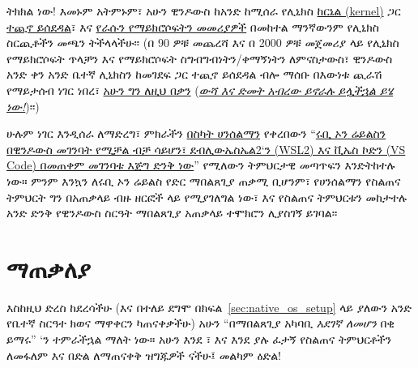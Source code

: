 ትክክል ነው! እመኑም አትምኑም፣ አሁን ዊንዶውስ ከአንድ ከሚሰራ የሊኒክስ \href{https://en.wikipedia.org/wiki/Kernel_(operating_system)}{ከርኔል (kernel)} ጋር \href{https://devblogs.microsoft.com/commandline/announcing-wsl-2/}{ተጪኖ ይሰደዳል}፣ እና \href{https://docs.microsoft.com/en-us/windows/wsl/install-win10}{የራሱን የማይክሮሶፍትን መመሪያዎች} በመከተል ማንኛውንም የሊኒክስ ስርጪቶችን መጫን ትችላላችሁ፡፡ (በ 90 ዎቹ መጨረሻ እና በ 2000 ዎቹ መጀመሪያ ላይ የሊኒክስ የማይክሮሶፍት ጥላቻን እና የማይክሮሶፍት ስግብግብነትን/ቀማኝነትን ለምናስታውስ፣ ዊንዶውስ አንድ ቀን አንድ ቤተኛ ሊኒክስን ከመገደፍ ጋር ተጪኖ ይሰደዳል ብሎ ማሰቡ በእውነቱ ጪራሽ የማይታሰብ ነገር ነበረ፣ \href{https://docs.microsoft.com/en-us/windows/wsl/install-win10}{አሁን ግን ለዚህ በቃን} (\href{https://youtu.be/JmzuRXLzqKk}{\emph{ውሻ እና ድመት አብረው ይኖራሉ ይሏችኋል ይሄ ነው!}})፡፡)

ሁሉም ነገር እንዲሰራ ለማድረግ፣ ምክራችን \href{https://www.hanselman.com/}{በስካት ሀንሰልማን} የቀረበውን ``\href{https://www.hanselman.com/blog/RubyOnRailsOnWindowsIsNotJustPossibleItsFabulousUsingWSL-8AndVSCode.aspx}{ሩቢ ኦን ሬይልስን በዊንዶውስ መገንባት የሚቻል ብቻ ሳይሆን፣ ደብሊውኤስኤል2`ን (WSL2) እና ቪኤስ ኮድን (VS Code) በመጠቀም መገንባቱ እጅግ ድንቅ ነው}'' የሚለውን ትምህርታዊ መጣጥፍን እንድትከተሉ ነው። ምንም እንኳን ለሩቢ ኦን ሬይልስ የድር ማበልጸጊያ ጠቃሚ ቢሆንም፣ የሀንሰልማን የስልጠና ትምህርት ግን በአጠቃላይ ብዙ ዘርፎች ላይ የሚያገለግል ነው፣ እና የስልጠና ትምህርቱን መከታተሉ አንድ ድንቅ የዊንዶውስ ስርዓት ማበልጸጊያ አጠቃላይ ተሞክሮን ሊያስገኝ ይገባል፡፡



\section{ማጠቃለያ} %
\label{sec:conclusion}

እስከዚህ ድረስ ከደረሳችሁ (እና በተለይ ደግሞ በክፍል~\ref{sec:native_os_setup} ላይ ያለውን አንድ የቤተኛ ስርዓተ ክወና ማዋቀርን ካጠናቀቃችሁ) አሁን ``በማበልጸጊያ አካባቢ \emph{አደገኛ ለመሆን} በቂ ይማሩ'' `ን ተምራችኋል ማለት ነው። አሁን እንደ \lecss\/፣ \ler እና እንደ \rort ያሉ ፈታኝ የስልጠና ትምህርቶችን ለመፋለም እና በድል ለማጠናቀቅ ዝግጁዎች ናችሁ፤ መልካም ዕድል!


\bigskip


